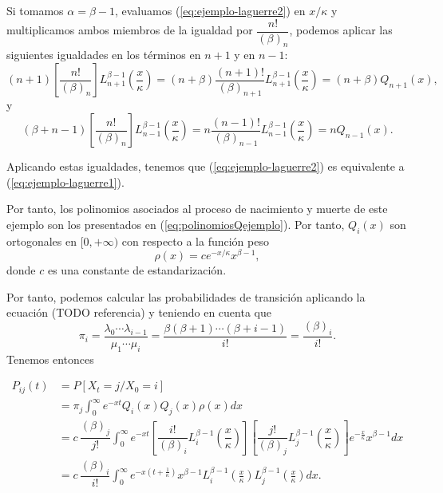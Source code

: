 \begin{ejemplo}
    Si tomamos $\alpha = \beta-1$, evaluamos (\ref{eq:ejemplo-laguerre2}) en $x/\kappa$ y multiplicamos ambos miembros de la igualdad por $\dfrac{n!}{(\beta)_n}$, podemos aplicar las siguientes igualdades en los términos en $n+1$ y en $n-1$:
    $$
    (n+1)\left[\dfrac{n!}{(\beta)_n}\right]L_{n+1}^{\beta-1} \left(\frac x \kappa\right) = (n+\beta)\dfrac{(n+1)!}{(\beta)_{n+1}} L_{n+1}^{\beta-1} \left(\frac x \kappa\right) = (n+\beta)Q_{n+1}(x),
    $$
    y
    $$
    (\beta+n-1)\left[\dfrac{n!}{(\beta)_n}\right]L_{n-1}^{\beta-1} \left(\frac x \kappa\right) = n\dfrac{(n-1)!}{(\beta)_{n-1}} L_{n-1}^{\beta-1} \left(\frac x \kappa\right) =n Q_{n-1}(x).
    $$
    
    Aplicando estas igualdades, tenemos que (\ref{eq:ejemplo-laguerre2}) es equivalente a (\ref{eq:ejemplo-laguerre1}).

    Por tanto, los polinomios asociados al proceso de nacimiento y muerte de este ejemplo son los presentados en (\ref{eq:polinomiosQejemplo}). Por tanto, $Q_i(x)$ son ortogonales en $[0,+\infty)$ con respecto a la función peso 
    $$
    \rho(x) = ce^{-x/\kappa} x^{\beta-1},
    $$
    donde $c$ es una constante de estandarización.

    Por tanto, podemos calcular las probabilidades de transición aplicando la ecuación (TODO referencia) y teniendo en cuenta que
    $$
        \pi_i = \dfrac{\lambda_0\cdots \lambda_{i-1}}{\mu_1\cdots \mu_i} = \dfrac{\beta(\beta+1)\cdots (\beta+i-1)}{i!} = \dfrac{(\beta)_i}{i!}.
    $$
    Tenemos entonces

    \begin{equation*}
        \begin{split}
            P_{ij}(t) &= P[X_t = j/X_0=i] \\
            &= \pi_j\int_0^\infty e^{-xt}Q_i(x)Q_j(x)\rho(x)dx \\
            &= c\, \dfrac{(\beta)_j}{j!}\int_0^\infty e^{-xt}\left[\dfrac{i!}{(\beta)_i} L_i^{\beta-1}\left(\dfrac{x}{\kappa}\right)\right]\left[\dfrac{j!}{(\beta)_j} L_j^{\beta-1}\left(\dfrac{x}{\kappa}\right)\right]e^{-\frac x \kappa}x^{\beta-1}dx \\
            &= c\, \dfrac{(\beta)_i}{i!}\int_0^\infty e^{-x(t+\frac 1 \kappa)} x^{\beta-1} L_i^{\beta-1}\left(\frac x \kappa\right) L_j^{\beta-1}\left(\frac x \kappa\right) dx. 
        \end{split}
    \end{equation*}

\end{ejemplo}